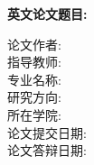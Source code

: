 {\begin{titlepage}
\begin{center}
    \par \vspace{0.5em}
    {\bfseries\songti 英文论文题目: }\uline{\hfill{\fontsize{16}{20}\selectfont\mbox{\thesicnutitleea}} \hfill}
    \par \vspace{0.5em}
    \hspace{\MyCT}\uline{\hfill\textrm{\fontsize{16}{20}\selectfont\mbox{\thesicnutitleeb}} \hfill}
    \par \vspace{0.5em}
    \hspace{\MyCT}\uline{\hfill\textrm{\fontsize{16}{20}\selectfont\mbox{\thesicnutitleec}} \hfill}
    \par \vspace{2em}
    \begin{minipage}[t]{22em}
      论文作者: \uline{\hfill\fangsong\mbox{\thesicnuauthorc}\hfill}\\[0.5em]
      指导教师: \uline{\hfill\fangsong\mbox{\thesicnusupervisorc}\hfill}\\[0.5em]
      专业名称: \uline{\hfill\fangsong\mbox{\thesicnumajorc}\hfill}\\[0.5em]
      研究方向: \uline{\hfill\fangsong\mbox{\thesicnuresearch}\hfill}\\[0.5em]
      所在学院: \uline{\hfill\fangsong\mbox{\thesicnucollege}\hfill}\\[0.5em]
      论文提交日期: \uline{\hfill\fangsong\mbox{\thesicnudateofsubmit}}\\
      论文答辩日期: \uline{\hfill\fangsong\mbox{\thesicnudateofdefence}}
      \par
    \end{minipage}
  \end{center}
\end{titlepage}
\thispagestyle{empty}
\cleardoublepage
}


